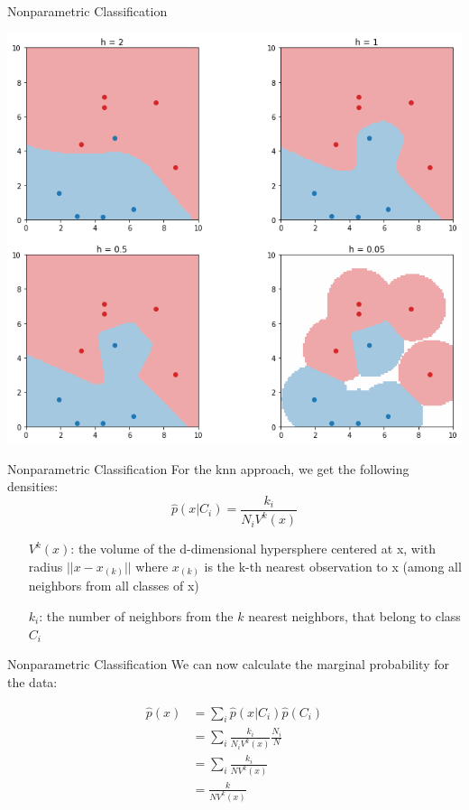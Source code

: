 \documentclass{beamer}
\begin{document}
\begin{frame}[fragile]{Nonparametric Classification}
\begin{center}
  \includegraphics[height=0.9\textheight]{images/classification_kernel.png}
\end{center}
\end{frame}


\begin{frame}[fragile]{Nonparametric Classification}	
For the knn approach, we get the following densities:
	\begin{equation}
		\hat p(x|C_{i})=\frac{k_{i}}{N_{i}V^{k}(x)}
	\end{equation} 		
  
\begin{enumerate}[\hspace{2cm}]
  \item[$V^{k}(x)$:] the volume of the d-dimensional hypersphere centered
  at x, with radius $||x-x_{(k)}||$ where $x_{(k)}$ is the k-th nearest observation
  to x (among all neighbors from all classes of x)
  \item[$k_i$:] the number of neighbors from the $k$ nearest neighbors, that belong to class $C_i$
\end{enumerate}	
\end{frame}


\begin{frame}[fragile]{Nonparametric Classification}
	We can now calculate the marginal probability for the data:
  
  \begin{align}
    \hat p(x) &= \sum_i \hat p(x | C_i) \hat p(C_i)\\
              &= \sum_i \frac{k_{i}}{N_{i}V^{k}(x)} \frac{N_i}{N}\\
              &= \sum_i \frac{k_{i}}{NV^{k}(x)}\\
              &= \frac{k}{NV^{k}(x)}
  \end{align}
\end{frame}
\end{document}
